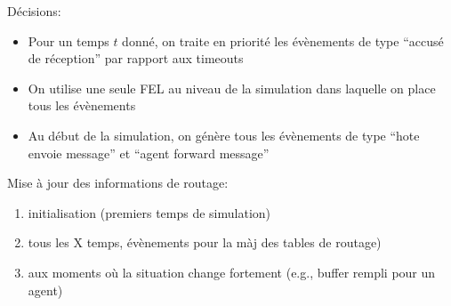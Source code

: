 \documentclass[a4paper,11pt]{report}
\begin{document}

\tableofcontents %
\pagebreak
\listoffigures %
\pagebreak
\listoftables %
\pagebreak

Décisions:
\begin{itemize}
 \item Pour un temps $t$ donné, on traite en priorité les évènements de type ``accusé de réception'' par rapport aux timeouts 
 \item On utilise une seule FEL au niveau de la simulation dans laquelle on place tous les évènements
 \item Au début de la simulation, on génère tous les évènements de type ``hote envoie message'' et ``agent forward message''
\end{itemize}


Mise à jour des informations de routage:
\begin{enumerate}
 \item initialisation (premiers temps de simulation)
 \item tous les X temps, évènements pour la màj des tables de routage)
 \item aux moments où la situation change fortement (e.g., buffer rempli pour un agent)
\end{enumerate}

\clearpage
\end{document}
